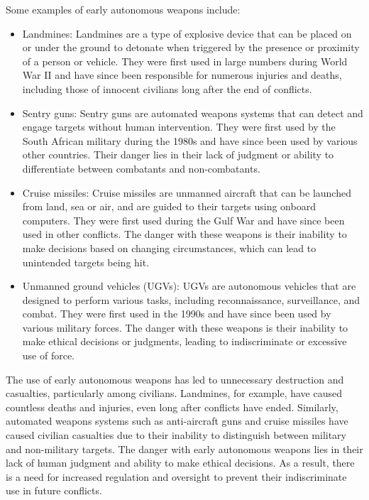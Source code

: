 Some examples of early autonomous weapons include:
\begin{itemize}
\item Landmines: Landmines are a type of explosive device that can be placed on or under the ground to detonate when triggered by the presence or proximity of a person or vehicle. They were first used in large numbers during World War II and have since been responsible for numerous injuries and deaths, including those of innocent civilians long after the end of conflicts.
\item Sentry guns: Sentry guns are automated weapons systems that can detect and engage targets without human intervention. They were first used by the South African military during the 1980s and have since been used by various other countries. Their danger lies in their lack of judgment or ability to differentiate between combatants and non-combatants. 

\item Cruise missiles: Cruise missiles are unmanned aircraft that can be launched from land, sea or air, and are guided to their targets using onboard computers. They were first used during the Gulf War and have since been used in other conflicts. The danger with these weapons is their inability to make decisions based on changing circumstances, which can lead to unintended targets being hit.

\item Unmanned ground vehicles (UGVs): UGVs are autonomous vehicles that are designed to perform various tasks, including reconnaissance, surveillance, and combat. They were first used in the 1990s and have since been used by various military forces. The danger with these weapons is their inability to make ethical decisions or judgments, leading to indiscriminate or excessive use of force. 
\end{itemize}
The use of early autonomous weapons has led to unnecessary destruction and casualties, particularly among civilians. Landmines, for example, have caused countless deaths and injuries, even long after conflicts have ended. Similarly, automated weapons systems such as anti-aircraft guns and cruise missiles have caused civilian casualties due to their inability to distinguish between military and non-military targets. The danger with early autonomous weapons lies in their lack of human judgment and ability to make ethical decisions. As a result, there is a need for increased regulation and oversight to prevent their indiscriminate use in future conflicts.

